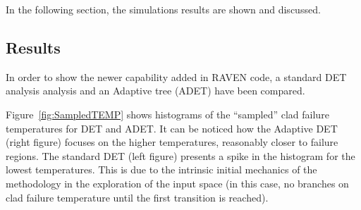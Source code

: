 In the following section, the simulations results are shown and discussed.
\subsection{Results} 
In order to show the newer capability added in RAVEN code, a standard DET~\cite{alfonsiPSA,DETmilestone2013} analysis analysis and an Adaptive tree (ADET) have been compared. 

Figure~\ref{fig:SampledTEMP} shows histograms of the “sampled” clad failure temperatures for DET and ADET. It can be noticed how the Adaptive DET (right figure) focuses on the higher temperatures, reasonably closer to failure regions. The standard DET (left figure) presents a spike in the histogram for the lowest temperatures. This is due to the intrinsic initial mechanics of the methodology in the exploration of the input space (in this case, no branches on clad failure temperature until the first transition is reached).

